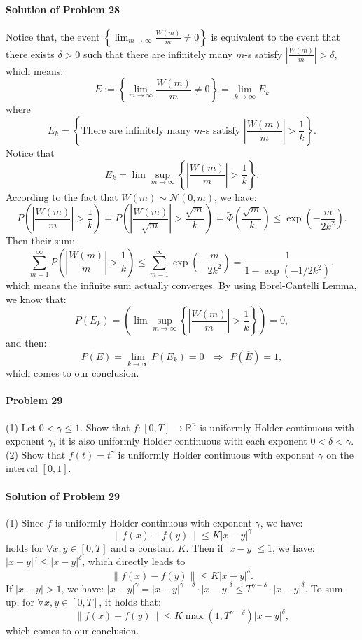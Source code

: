 \documentclass{article}
\begin{document}
\paragraph{Solution of Problem 28} Notice that, the event $\left\{\lim_{m\rightarrow\infty}\frac{W(m)}{m}\neq 0\right\}$ is equivalent to the event that there exists $\delta>0$ such that there are infinitely many $m$-s satisfy $\left|\frac{W(m)}{m}\right|>\delta$, which means:
\[E := \left\{\lim_{m\rightarrow\infty}\frac{W(m)}{m}\neq 0\right\} = \lim_{k\rightarrow\infty}E_k\]
where 
\[E_k = \left\{\text{There are infinitely many }m\text{-s satisfy }\left|\frac{W(m)}{m}\right|>\frac1k\right\}.\]
Notice that
\[E_k = \lim\sup_{m\rightarrow\infty}\left\{\left|\frac{W(m)}{m}\right|>\frac1k\right\}.\]
According to the fact that $W(m)\sim\mathcal N(0,m)$, we have:
\[P\left(\left|\frac{W(m)}{m}\right|>\frac1k\right)=P\left(\left|\frac{W(m)}{\sqrt{m}}\right|>\frac{\sqrt{m}}{k}\right) = \widetilde{\Phi}\left(\frac{\sqrt{m}}{k}\right)\leqslant \exp\left(-\frac{m}{2k^2}\right).\]
Then their sum:
\[\sum_{m=1}^{\infty}P\left(\left|\frac{W(m)}{m}\right|>\frac1k\right)\leqslant \sum_{m=1}^{\infty}\exp\left(-\frac{m}{2k^2}\right) = \frac{1}{1-\exp(-1/2k^2)},\]
which means the infinite sum actually converges. By using Borel-Cantelli Lemma, we know that:
\[P(E_k)=\left(\lim\sup_{m\rightarrow\infty}\left\{\left|\frac{W(m)}{m}\right|>\frac1k\right\}\right)=0,\]
and then:
\[P(E)=\lim_{k\rightarrow\infty}P(E_k)=0~~~\Rightarrow~~P(\overline{E})=1,\]
which comes to our conclusion.


\paragraph{Problem 29} (1) Let $0<\gamma\leqslant 1$. Show that $f:[0,T]\rightarrow \mathbb{R}^n$ is uniformly Holder continuous with exponent $\gamma$, it is also uniformly Holder continuous with each exponent $0<\delta<\gamma$. \\
(2) Show that $f(t)=t^{\gamma}$ is uniformly Holder continuous with exponent $\gamma$ on the interval $[0,1]$.

\paragraph{Solution of Problem 29} (1) Since $f$ is uniformly Holder continuous with exponent $\gamma$, we have:
\[\|f(x)-f(y)\|\leqslant K |x-y|^{\gamma}\]
holds for $\forall x,y\in[0,T]$ and a constant $K$. Then if $|x-y|\leqslant 1$, we have: $|x-y|^{\gamma}\leqslant |x-y|^{\delta}$, which directly leads to
\[\|f(x)-f(y)\|\leqslant K |x-y|^{\delta}.\]
If $|x-y|>1$, we have: $|x-y|^{\gamma}=|x-y|^{\gamma-\delta}\cdot|x-y|^{\delta}\leqslant T^{\gamma-\delta}\cdot |x-y|^{\delta}$. To sum up, for $\forall x,y\in[0,T]$, it holds that:
\[\|f(x)-f(y)\|\leqslant K\max(1,T^{\gamma-\delta}) |x-y|^{\delta},\]
which comes to our conclusion.\\
\end{document}
